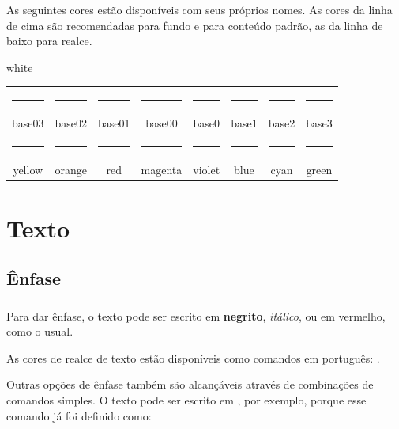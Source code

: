 \documentclass[aspectratio=169]{beamer}
\begin{document}
\begin{frame}[t]\frametitle{\secname}\framesubtitle{\subsecname}
  As seguintes cores estão disponíveis com seus próprios nomes.
  As cores da linha de cima são recomendadas para fundo e para conteúdo padrão, as da linha de baixo para realce.\\[1em]
  \begin{beamercolorbox}[center]{white}
    ~\\[1em]\scriptsize
  \begin{tabular}{cccccccc}
    \color{base03}\rule{1.2cm}{1.2cm} & \color{base02}\rule{1.2cm}{1.2cm} & \color{base01}\rule{1.2cm}{1.2cm} & \color{base00}\rule{1.2cm}{1.2cm} & \color{base0}\rule{1.2cm}{1.2cm}  & \color{base1}\rule{1.2cm}{1.2cm}  &\color{base2}\rule{1.2cm}{1.2cm}  & \color{base3}\rule{1.2cm}{1.2cm} \\
    base03 & base02 & base01 & base00 & base0 & base1 & base2 & base3 \\[1em]
    \color{yellow}\rule{1.2cm}{1.2cm} & \color{orange}\rule{1.2cm}{1.2cm} & \color{red}\rule{1.2cm}{1.2cm} & \color{magenta}\rule{1.2cm}{1.2cm} & \color{violet}\rule{1.2cm}{1.2cm}  & \color{blue}\rule{1.2cm}{1.2cm}  &\color{cyan}\rule{1.2cm}{1.2cm}  & \color{green}\rule{1.2cm}{1.2cm} \\
    yellow & orange & red & magenta & violet & blue & cyan & green \\[1em]
  \end{tabular}
  \end{beamercolorbox}
\end{frame}

\section{Texto}

\subsection{Ênfase}

\begin{frame}[t,fragile]\frametitle{\secname}\framesubtitle{\subsecname}
  Para dar ênfase, o texto pode ser escrito em \textbf{negrito}, \emph{itálico}, ou em \alert{vermelho}, como o usual.

  As cores de realce de texto estão disponíveis como comandos em português:
         .

  Outras opções de ênfase também são alcançáveis através de combinações de comandos simples.
  O texto pode ser escrito em , por exemplo, porque esse comando já foi definido como:
\begin{snippet}[style=text]
\newcommand{\cianito}[1]{%
  \ciano{\textbf{#1}}%
}
\end{snippet}

\end{frame}
\end{document}
